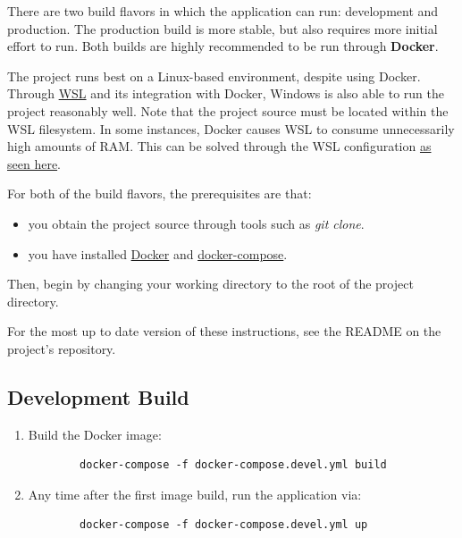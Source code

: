 \documentclass[a4paper, 12pt, titlepage]{article}
\begin{document}
  There are two build flavors in which the application can run: development and production.
  The production build is more stable, but also requires more initial effort to run.
  Both builds are highly recommended to be run through \textbf{Docker}.
  
  The project runs best on a Linux-based environment, despite using Docker. 
  Through \href{https://docs.microsoft.com/en-us/windows/wsl/about}{WSL} and its integration with Docker,
  Windows is also able to run the project reasonably well.
  Note that the project source must be located within the WSL filesystem.
  In some instances, Docker causes WSL to consume unnecessarily high amounts of RAM.
  This can be solved through the WSL configuration
  \href{https://github.com/microsoft/WSL/issues/4166\#issuecomment-526725261}{as seen here}.
  
  For both of the build flavors, the prerequisites are that:
  \begin{itemize}
    \item you obtain the project source through tools such as \textit{git clone}.
    \item you have installed \href{https://docs.docker.com/get-docker/}{Docker}
      and \href{https://docs.docker.com/compose/install/}{docker-compose}.
  \end{itemize}
  
  Then, begin by changing your working directory to the root of the project directory.
  
  For the most up to date version of these instructions, see the README on the project's repository.
  
  \subsection{Development Build}
  
  \begin{enumerate}
    \item Build the Docker image:
      \begin{verbatim}
        docker-compose -f docker-compose.devel.yml build
      \end{verbatim}
    \item Any time after the first image build, run the application via:
      \begin{verbatim}
        docker-compose -f docker-compose.devel.yml up
      \end{verbatim}
  \end{enumerate}
  
\end{document}
